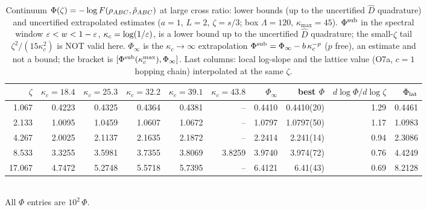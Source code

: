 \begin{table}[ht]\centering\small
\caption{Continuum \(\Phi(\zeta)=-\log F(\rho_{ABC},\tilde\rho_{ABC})\) at large cross ratio: lower bounds (up to the uncertified \(\widehat D\) quadrature) and uncertified extrapolated estimates (\(a=1\), \(L=2\), \(\zeta=s/3\); box \(\Lambda=120\), \(\kappa_{\max}=45\)). \(\Phi^{\rm sub}\) in the spectral window \(\varepsilon<w<1-\varepsilon\), \(\kappa_c=\log(1/\varepsilon)\), is a lower bound up to the uncertified \(\widehat D\) quadrature; the small-\(\zeta\) tail \(\zeta^2/(15\kappa_c^2)\) is NOT valid here. \(\Phi_\infty\) is the \(\kappa_c\to\infty\) extrapolation \(\Phi^{\rm sub}=\Phi_\infty-b\,\kappa_c^{-p}\) (\(p\) free), an estimate and not a bound; the bracket is \([\Phi^{\rm sub}(\kappa_c^{\max}),\Phi_\infty]\). Last columns: local log-slope and the lattice value (O7a, \(c=1\) hopping chain) interpolated at the same \(\zeta\).}\label{tab:largezeta}
\begin{tabular}{rrrrrr r r r r}\toprule
\(\zeta\) & \(\kappa_c{=}18.4\) & \(\kappa_c{=}25.3\) & \(\kappa_c{=}32.2\) & \(\kappa_c{=}39.1\) & \(\kappa_c{=}43.8\) & \(\Phi_\infty\) & best \(\Phi\) & \(d\log\Phi/d\log\zeta\) & \(\Phi_{\rm lat}\) \\\midrule
1.067 & 0.4223 & 0.4325 & 0.4364 & 0.4381 & -- & 0.4410 & 0.4410(20) & 1.29 & 0.4461 \\
2.133 & 1.0095 & 1.0459 & 1.0607 & 1.0672 & -- & 1.0797 & 1.0797(50) & 1.17 & 1.0983 \\
4.267 & 2.0025 & 2.1137 & 2.1635 & 2.1872 & -- & 2.2414 & 2.241(14) & 0.94 & 2.3086 \\
8.533 & 3.3255 & 3.5981 & 3.7355 & 3.8069 & 3.8259 & 3.9740 & 3.974(72) & 0.76 & 4.4249 \\
17.067 & 4.7472 & 5.2748 & 5.5718 & 5.7395 & -- & 6.4121 & 6.41(43) & 0.69 & 8.2128 \\
\bottomrule\end{tabular}
\\[2pt]\footnotesize All \(\Phi\) entries are \(10^{2}\,\Phi\).
\end{table}
